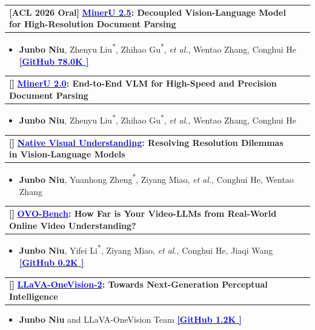 \documentclass[letterpaper,11pt]{article}
\makeatletter
\newcommand{\resumeItem}[1]{
  \item\small{
    {#1 \vspace{-2pt}}
  }
}
\newcommand{\resumeProjectHeading}[2]{
    \item
    \begin{tabular*}{1.001\textwidth}{l@{\extracolsep{\fill}}r}
      \small#1 & \textbf{\small #2}\\
    \end{tabular*}\vspace{-7pt}
}
\newlength{\venuewidth}
\newcommand{\venue}[1]{\textbf{[\makebox[\venuewidth][l]{#1}]}\hspace{2pt}}
\newcommand{\venuewide}[1]{\textbf{[#1]}\hspace{2pt}}
\newcommand{\resumeItemListStart}{\begin{itemize}}
\newcommand{\resumeItemListEnd}{\end{itemize}\vspace{-5pt}}
\makeatother
\begin{document}
\vspace{-15pt}

\resumeProjectHeading{\venuewide{ACL 2026 Oral} \textbf{\href{https://arxiv.org/abs/2509.22186}{\textcolor{blue}{MinerU 2.5}}: Decoupled Vision-Language Model for High-Resolution Document Parsing}}{~}
\resumeItemListStart
\resumeItem{\textbf{Junbo Niu}, Zhenyu Liu\textsuperscript{*}, Zhihao Gu\textsuperscript{*}, \textit{et al.}, Wentao Zhang, Conghui He \href{https://github.com/opendatalab/MinerU}{\textcolor{blue}{\textbf{[GitHub 78.0K \faStar]}}}}
\resumeItemListEnd

\vspace{-15pt}

\resumeProjectHeading{\venue{Tech Report} \textbf{\href{https://github.com/opendatalab/MinerU}{\textcolor{blue}{MinerU 2.0}}: End-to-End VLM for High-Speed and Precision Document Parsing}}{~}
\resumeItemListStart
\resumeItem{\textbf{Junbo Niu}, Zhenyu Liu\textsuperscript{*}, Zhihao Gu\textsuperscript{*}, \textit{et al.}, Wentao Zhang, Conghui He}
\resumeItemListEnd

\vspace{-15pt}

\resumeProjectHeading{\venue{CVPR 2026} \textbf{\href{https://arxiv.org/pdf/2506.12776}{\textcolor{blue}{Native Visual Understanding}}: Resolving Resolution Dilemmas in Vision-Language Models}}{~}
\resumeItemListStart
\resumeItem{\textbf{Junbo Niu}, Yuanhong Zheng\textsuperscript{*}, Ziyang Miao, \textit{et al.}, Conghui He, Wentao Zhang}
\resumeItemListEnd

\vspace{-15pt}

\resumeProjectHeading{\venue{CVPR 2025} \textbf{\href{https://openaccess.thecvf.com/content/CVPR2025/papers/Niu_OVO-Bench_How_Far_is_Your_Video-LLMs_from_Real-World_Online_Video_CVPR_2025_paper.pdf}{\textcolor{blue}{OVO-Bench}}: How Far is Your Video-LLMs from Real-World Online Video Understanding?}}{~}
\resumeItemListStart
\resumeItem{\textbf{Junbo Niu}, Yifei Li\textsuperscript{*}, Ziyang Miao, \textit{et al.}, Conghui He, Jiaqi Wang \href{https://github.com/JoeLeelyf/OVO-Bench}{\textcolor{blue}{\textbf{[GitHub 0.2K \faStar]}}}}
\resumeItemListEnd

\vspace{-15pt}

\resumeProjectHeading{\venue{Tech Report} \textbf{\href{https://arxiv.org/abs/2605.25979}{\textcolor{blue}{LLaVA-OneVision-2}}: Towards Next-Generation Perceptual Intelligence}}{~}
\resumeItemListStart
\resumeItem{\textbf{Junbo Niu} and LLaVA-OneVision Team \href{https://github.com/EvolvingLMMs-Lab/LLaVA-OneVision-2}{\textcolor{blue}{\textbf{[GitHub 1.2K \faStar]}}}}
\resumeItemListEnd
\end{document}
